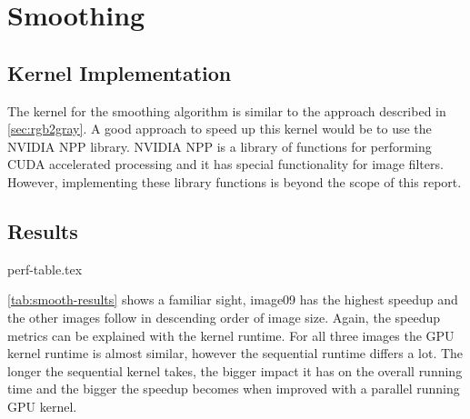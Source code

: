 \documentclass[final]{report}
\begin{document}
\chapter{Smoothing}

\section{Kernel Implementation}
The kernel for the smoothing algorithm is similar to the approach described in \cref{sec:rgb2gray}.
A good approach to speed up this kernel would be to use the NVIDIA NPP library.
NVIDIA NPP is a library of functions for performing CUDA accelerated processing and it has special functionality for image filters.
However, implementing these library functions is beyond the scope of this report.

\section{Results}
{perf-table.tex}

\cref{tab:smooth-results} shows a familiar sight, image09 has the highest speedup and the other images follow in descending order of image size.
Again, the speedup metrics can be explained with the kernel runtime.
For all three images the GPU kernel runtime is almost similar, however the sequential runtime differs a lot.
The longer the sequential kernel takes, the bigger impact it has on the overall running time and the bigger the speedup becomes when improved with a parallel running GPU kernel.

\end{document}
